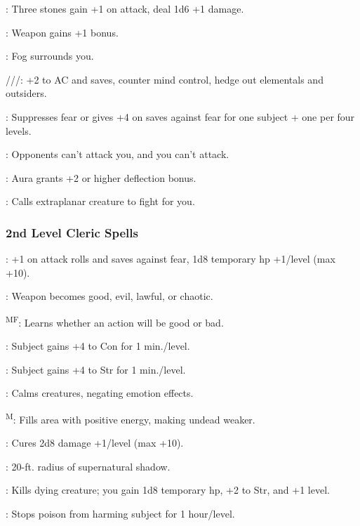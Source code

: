 : Three stones gain +1 on attack, deal 1d6 +1 damage.

: Weapon gains +1 bonus.

: Fog surrounds you.

///: +2 to AC and saves, counter mind control, hedge out elementals and outsiders.

: Suppresses fear or gives +4 on saves against fear for one subject + one per four levels.

: Opponents can't attack you, and you can't attack.

: Aura grants +2 or higher deflection bonus.

: Calls extraplanar creature to fight for you.

\subsubsection{2nd Level Cleric Spells}

: +1 on attack rolls and saves against fear, 1d8 temporary hp +1/level 
(max +10).

: Weapon becomes good, evil, lawful, or chaotic.

\textsuperscript{M}\textsuperscript{F}: Learns whether an action will be good or bad.

: Subject gains +4 to Con for 1 min./level.

: Subject gains +4 to Str for 1 min./level.

: Calms creatures, negating emotion effects.

\textsuperscript{M}: Fills area with positive energy, making undead weaker.

: Cures 2d8 damage +1/level (max +10).

: 20-ft. radius of supernatural shadow.

: Kills dying creature; you gain 1d8 temporary hp, +2 to Str, and +1 level.

: Stops poison from harming subject for 1 hour/level.

